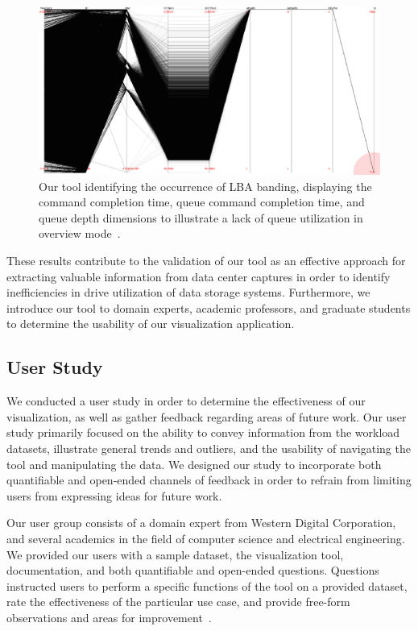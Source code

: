 \documentclass[journal]{vgtc}                %
\begin{document}
\begin{figure}[h!!]
 \centering
 \includegraphics[width=\columnwidth]{images/no_queue.eps}
 \caption[Output of our tool identifying the occurrence of LBA banding.]{Our tool identifying the occurrence of LBA banding, displaying the command completion time, queue command completion time, and queue depth dimensions to illustrate a lack of queue utilization in overview mode~\cite{internal:collab}.}
 \label{fig:no_queue}
\end{figure}

These results contribute to the validation of our tool as an effective approach for extracting valuable information from data center captures in order to identify inefficiencies in drive utilization of data storage systems. Furthermore, we introduce our tool to domain experts, academic professors, and graduate students to determine the usability of our visualization application.

\subsection{User Study}
We conducted a user study in order to determine the effectiveness of our visualization, as well as gather feedback regarding areas of future work. Our user study primarily focused on the ability to convey information from the workload datasets, illustrate general trends and outliers, and the usability of navigating the tool and manipulating the data. We designed our study to incorporate both quantifiable and open-ended channels of feedback in order to refrain from limiting users from expressing ideas for future work.

Our user group consists of a domain expert from Western Digital Corporation, and several academics in the field of computer science and electrical engineering. We provided our users with a sample dataset, the visualization tool, documentation, and both quantifiable and open-ended questions. Questions instructed users to perform a specific functions of the tool on a provided dataset, rate the effectiveness of the particular use case, and provide free-form observations and areas for improvement~\cite{steven_thesis}.
\end{document}
